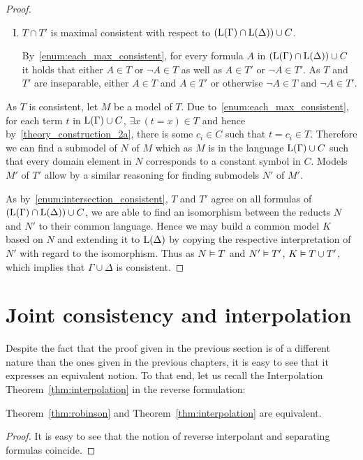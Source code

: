 \begin{proof}
\begin{enumerate}[I.]
		\item
			\label{enum:intersection_consistent}
			$T \cap T'$ is maximal consistent with respect to $(\operatorname{L}(\Gamma) \cap \operatorname{L}(\Delta)) \cup C$.

			By~\ref{enum:each_max_consistent}, for every formula $A$ in $(\operatorname{L}(\Gamma) \cap \operatorname{L}(\Delta)) \cup C$ it holds that either 
			$A \in T$ or $\lnot A \in T$ as well as
			$A \in T'$ or $\lnot A \in T'$. As $T$ and $T'$ are inseparable, either $A \in T$ and $A\in T'$ or otherwise $\lnot A \in T$ and $\lnot A \in T'$.

	\end{enumerate}


	As $T$ is consistent, let $M$ be a model of $T$.
	Due to~\ref{enum:each_max_consistent}, for each term $t$ in $\operatorname{L}(\Gamma)\cup C$, $\exists x\, (t = x) \in T$ and hence by~\ref{theory_construction_2a}, there is some $c_i \in C$ such that $t=c_i \in T$.
	Therefore we can find a submodel of $N$ of $M$ which as $M$ is in the language $\operatorname{L}(\Gamma)\cup C$ such that
	every domain element in $N$ corresponds to a constant symbol in $C$.
	Models $M'$ of $T'$ allow by a similar reasoning for finding submodels $N'$ of $M'$.

	As by~\ref{enum:intersection_consistent}, $T$ and $T'$ agree on all formulas of $(\operatorname{L}(\Gamma) \cap \operatorname{L}(\Delta))\cup C$, 
	we are able to find an isomorphism between the reducts $N$ and $N'$ to their common language.
	Hence we may build a common model $K$ based on $N$ and extending it to $\operatorname{L}(\Delta)$ by copying the respective interpretation of $N'$ with regard to the isomorphism.
	Thus as $N\vDash T$ and $N'\vDash T'$, $K\vDash T \cup T'$, which implies that $\Gamma\cup\Delta$ is consistent.
\end{proof}

\section{Joint consistency and interpolation}

Despite the fact that the proof given in the previous section is of a different nature than the ones given in the previous chapters, it is easy to see that it expresses an equivalent notion.
To that end, let us recall the Interpolation Theorem~\ref{thm:interpolation} in the reverse formulation:

\interpolationRevThm*

\begin{prop}
	Theorem~\ref{thm:robinson} and Theorem~\ref{thm:interpolation} are equivalent.
\end{prop}
\begin{proof}
	It is easy to see that the notion of reverse interpolant and separating formulas coincide.
\end{proof}





